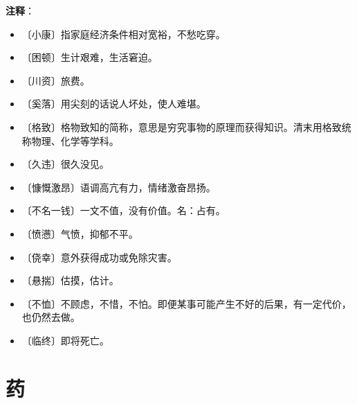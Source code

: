 \documentclass[12pt,UTF-8,openany]{ctexbook}
\begin{document}
\newpage

\textbf{注释}：

\vspace{-1em}

\begin{itemize}
    \setlength\itemsep{-0.2em}
    \item 〔小康〕指家庭经济条件相对宽裕，不愁吃穿。
    \item 〔困顿〕生计艰难，生活窘迫。
    \item 〔川资〕旅费。
    \item 〔奚落〕用尖刻的话说人坏处，使人难堪。
    \item 〔格致〕格物致知的简称，意思是穷究事物的原理而获得知识。清末用格致统称物理、化学等学科。
    \item 〔久违〕很久没见。
    \item 〔慷慨激昂〕语调高亢有力，情绪激奋昂扬。
    \item 〔不名一钱〕一文不值，没有价值。名：占有。
    \item 〔愤懑〕气愤，抑郁不平。
    \item 〔侥幸〕意外获得成功或免除灾害。
    \item 〔悬揣〕估摸，估计。
    \item 〔不恤〕不顾虑，不惜，不怕。即便某事可能产生不好的后果，有一定代价，也仍然去做。
    \item 〔临终〕即将死亡。
\end{itemize}

\chapter{药}
\end{document}
